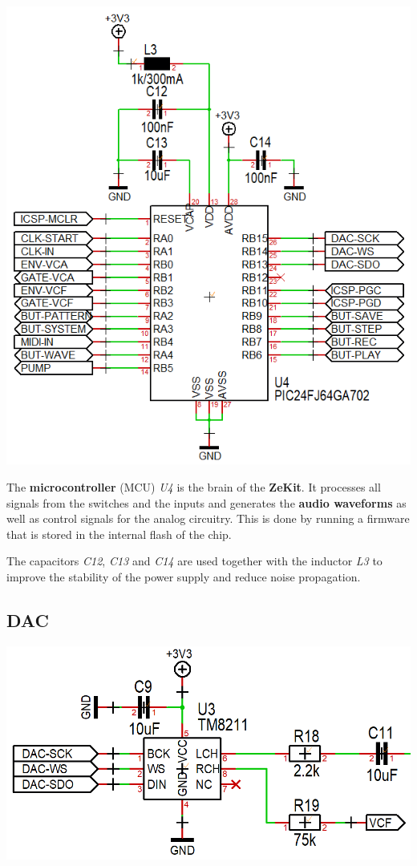 \documentclass{scrartcl}
\begin{document}
\begin{center}
    \includegraphics[scale=0.50]{assets/schema-mcu.png}
\end{center}

The \textbf{microcontroller} (MCU) \emph{U4} is the brain of the \textbf{ZeKit}. It processes all signals from the switches and the inputs and generates the \textbf{audio waveforms} as well as control signals for the analog circuitry. This is done by running a firmware that is stored in the internal flash of the chip.

The capacitors \emph{C12}, \emph{C13} and \emph{C14} are used together with the inductor \emph{L3} to improve the stability of the power supply and reduce noise propagation.

\subsection{DAC}

\begin{center}
    \includegraphics[scale=0.30]{assets/schema-dac.png}
\end{center}
\end{document}
